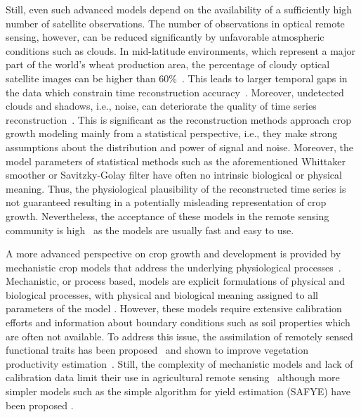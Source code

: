 Still, even such advanced models depend on the availability of a sufficiently high number of satellite observations. The number of observations in optical remote sensing, however, can be reduced significantly by unfavorable atmospheric conditions such as clouds. In mid-latitude environments, which represent a major part of the world's wheat production area, the percentage of cloudy optical satellite images can be higher than  60\%~\citep{sudmanns_assessing_2020}. This leads to larger temporal gaps in the data which constrain time reconstruction accuracy~\citep{zhou_reconstruction_2015}. Moreover, undetected clouds and shadows, i.e., noise, can deteriorate the quality of time series reconstruction~\citep{zhou_performance_2016}. This is significant as the reconstruction methods approach crop growth modeling mainly from a statistical perspective, i.e., they make strong assumptions about the distribution and power of signal and noise. Moreover, the model parameters of statistical methods such as the aforementioned Whittaker smoother or Savitzky-Golay filter have often no intrinsic biological or physical meaning. Thus, the physiological plausibility of the reconstructed time series is not guaranteed resulting in a potentially misleading representation of crop growth. Nevertheless, the acceptance of these models in the remote sensing community is high~\citep{kooistra_reviews_2023} as the models are usually fast and easy to use.

A more advanced perspective on crop growth and development is provided by mechanistic crop models that address the underlying physiological processes~\citep{delecolle_remote_1992, jamieson_sirius_1998,keating_overview_2003}. Mechanistic, or process based, models are explicit formulations of physical and biological processes, with physical and biological meaning assigned to all parameters of the model \citep{cox_towards_2006}. However, these models require extensive calibration efforts and information about boundary conditions such as soil properties which are often not available. To address this issue, the assimilation of remotely sensed functional traits has been proposed~\citep{pellenq_methodology_2004} and shown to improve vegetation productivity estimation~\citep{huang_assimilation_2019, waldner_high_2019}. Still, the complexity of mechanistic models and lack of calibration data limit their use in agricultural remote sensing~\citep{weiss_remote_2020} although more simpler models such as the simple algorithm for yield estimation (SAFYE) have been proposed \citep{ma_wheat_2022}.

